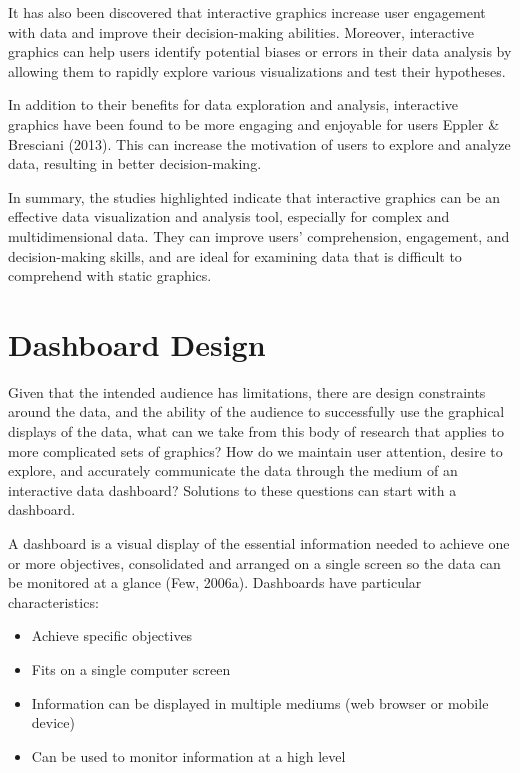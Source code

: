 \documentclass[print]{nuthesis}
\begin{document}
It has also been discovered that interactive graphics increase user engagement with data and improve their decision-making abilities.
Moreover, interactive graphics can help users identify potential biases or errors in their data analysis by allowing them to rapidly explore various visualizations and test their hypotheses.

In addition to their benefits for data exploration and analysis, interactive graphics have been found to be more engaging and enjoyable for users Eppler \& Bresciani (2013).
This can increase the motivation of users to explore and analyze data, resulting in better decision-making.

In summary, the studies highlighted indicate that interactive graphics can be an effective data visualization and analysis tool, especially for complex and multidimensional data.
They can improve users' comprehension, engagement, and decision-making skills, and are ideal for examining data that is difficult to comprehend with static graphics.

\hypertarget{dashboard-design}{%
\section{Dashboard Design}\label{dashboard-design}}

Given that the intended audience has limitations, there are design constraints around the data, and the ability of the audience to successfully use the graphical displays of the data, what can we take from this body of research that applies to more complicated sets of graphics?
How do we maintain user attention, desire to explore, and accurately communicate the data through the medium of an interactive data dashboard?
Solutions to these questions can start with a dashboard.

A dashboard is a visual display of the essential information needed to achieve one or more objectives, consolidated and arranged on a single screen so the data can be monitored at a glance (Few, 2006a).
Dashboards have particular characteristics:

\begin{itemize}
\item
  Achieve specific objectives
\item
  Fits on a single computer screen
\item
  Information can be displayed in multiple mediums (web browser or mobile device)
\item
  Can be used to monitor information at a high level
\end{itemize}
\end{document}
